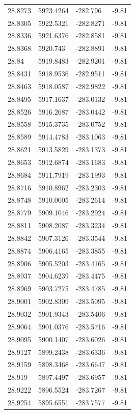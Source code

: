 \begin{table}[H]
\begin{tabular}{llll}
28.8273 & 5923.4264 & -282.796 & -9.81 \\
28.8305 & 5922.5321 & -282.8271 & -9.81 \\
28.8336 & 5921.6376 & -282.8581 & -9.81 \\
28.8368 & 5920.743 & -282.8891 & -9.81 \\
28.84 & 5919.8483 & -282.9201 & -9.81 \\
28.8431 & 5918.9536 & -282.9511 & -9.81 \\
28.8463 & 5918.0587 & -282.9822 & -9.81 \\
28.8495 & 5917.1637 & -283.0132 & -9.81 \\
28.8526 & 5916.2687 & -283.0442 & -9.81 \\
28.8558 & 5915.3735 & -283.0752 & -9.81 \\
28.8589 & 5914.4783 & -283.1063 & -9.81 \\
28.8621 & 5913.5829 & -283.1373 & -9.81 \\
28.8653 & 5912.6874 & -283.1683 & -9.81 \\
28.8684 & 5911.7919 & -283.1993 & -9.81 \\
28.8716 & 5910.8962 & -283.2303 & -9.81 \\
28.8748 & 5910.0005 & -283.2614 & -9.81 \\
28.8779 & 5909.1046 & -283.2924 & -9.81 \\
28.8811 & 5908.2087 & -283.3234 & -9.81 \\
28.8842 & 5907.3126 & -283.3544 & -9.81 \\
28.8874 & 5906.4165 & -283.3855 & -9.81 \\
28.8906 & 5905.5203 & -283.4165 & -9.81 \\
28.8937 & 5904.6239 & -283.4475 & -9.81 \\
28.8969 & 5903.7275 & -283.4785 & -9.81 \\
28.9001 & 5902.8309 & -283.5095 & -9.81 \\
28.9032 & 5901.9343 & -283.5406 & -9.81 \\
28.9064 & 5901.0376 & -283.5716 & -9.81 \\
28.9095 & 5900.1407 & -283.6026 & -9.81 \\
28.9127 & 5899.2438 & -283.6336 & -9.81 \\
28.9159 & 5898.3468 & -283.6647 & -9.81 \\
28.919 & 5897.4497 & -283.6957 & -9.81 \\
28.9222 & 5896.5524 & -283.7267 & -9.81 \\
28.9254 & 5895.6551 & -283.7577 & -9.81 \\

\end{tabular}
\end{table}
